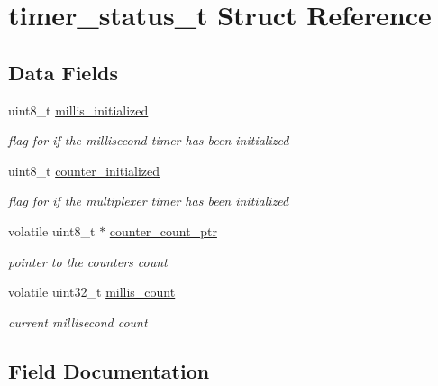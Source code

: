 \hypertarget{structtimer__status__t}{}\section{timer\+\_\+status\+\_\+t Struct Reference}
\label{structtimer__status__t}
\subsection*{Data Fields}
\begin{DoxyCompactItemize}
\item 
uint8\+\_\+t \hyperlink{structtimer__status__t_a6d1fa9c7cc23c7a220fe2e10b21c7a36}{millis\+\_\+initialized}
\begin{DoxyCompactList}\small\item\em flag for if the millisecond timer has been initialized \end{DoxyCompactList}\item 
uint8\+\_\+t \hyperlink{structtimer__status__t_a73002fe8045c77d68c87dbb60289df08}{counter\+\_\+initialized}
\begin{DoxyCompactList}\small\item\em flag for if the multiplexer timer has been initialized \end{DoxyCompactList}\item 
volatile uint8\+\_\+t $\ast$ \hyperlink{structtimer__status__t_acbaa3c3476c9e234f13ae0051816699f}{counter\+\_\+count\+\_\+ptr}
\begin{DoxyCompactList}\small\item\em pointer to the counter\textquotesingle{}s count \end{DoxyCompactList}\item 
volatile uint32\+\_\+t \hyperlink{structtimer__status__t_af90d90b046e42ab75ab431f74b46b216}{millis\+\_\+count}
\begin{DoxyCompactList}\small\item\em current millisecond count \end{DoxyCompactList}\end{DoxyCompactItemize}


\subsection{Field Documentation}
\hypertarget{structtimer__status__t_acbaa3c3476c9e234f13ae0051816699f}{}\label{structtimer__status__t_acbaa3c3476c9e234f13ae0051816699f} 

